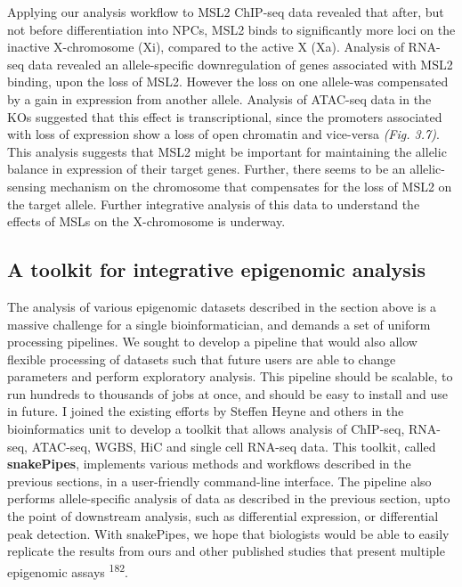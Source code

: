 \documentclass[11pt,twoside]{MPIthesis}
\theoremstyle{definition}
\theoremstyle{definition}
\theoremstyle{definition}
\theoremstyle{remark}
\begin{document}
\clearpage

Applying our analysis workflow to MSL2 ChIP-seq data revealed that
after, but not before differentiation into NPCs, MSL2 binds to
significantly more loci on the inactive X-chromosome (Xi), compared to
the active X (Xa). Analysis of RNA-seq data revealed an allele-specific
downregulation of genes associated with MSL2 binding, upon the loss of
MSL2. However the loss on one allele-was compensated by a gain in
expression from another allele. Analysis of ATAC-seq data in the KOs
suggested that this effect is transcriptional, since the promoters
associated with loss of expression show a loss of open chromatin and
vice-versa \emph{(Fig. 3.7)}. This analysis suggests that MSL2 might be
important for maintaining the allelic balance in expression of their
target genes. Further, there seems to be an allelic-sensing mechanism on
the chromosome that compensates for the loss of MSL2 on the target
allele. Further integrative analysis of this data to understand the
effects of MSLs on the X-chromosome is underway.

\subsection{A toolkit for integrative epigenomic
analysis}\label{a-toolkit-for-integrative-epigenomic-analysis}

The analysis of various epigenomic datasets described in the section
above is a massive challenge for a single bioinformatician, and demands
a set of uniform processing pipelines. We sought to develop a pipeline
that would also allow flexible processing of datasets such that future
users are able to change parameters and perform exploratory analysis.
This pipeline should be scalable, to run hundreds to thousands of jobs
at once, and should be easy to install and use in future. I joined the
existing efforts by Steffen Heyne and others in the bioinformatics unit
to develop a toolkit that allows analysis of ChIP-seq, RNA-seq,
ATAC-seq, WGBS, HiC and single cell RNA-seq data. This toolkit, called
\textbf{snakePipes}, implements various methods and workflows described
in the previous sections, in a user-friendly command-line interface. The
pipeline also performs allele-specific analysis of data as described in
the previous section, upto the point of downstream analysis, such as
differential expression, or differential peak detection. With
snakePipes, we hope that biologists would be able to easily replicate
the results from ours and other published studies that present multiple
epigenomic assays \textsuperscript{182}.
\end{document}
